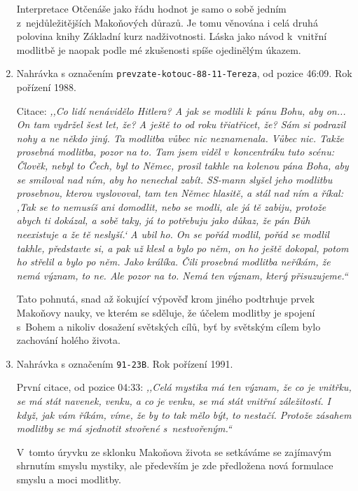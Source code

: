 \begin{enumerate}
{    Interpretace Otčenáše jako řádu hodnot je samo o sobě jedním
    z~nejdůležitějších Makoňových důrazů. Je tomu věnována i celá druhá polovina
    knihy Základní kurz nadživotnosti.\cite{KaMaZKN} Láska jako návod k~vnitřní
    modlitbě je naopak podle mé zkušenosti spíše ojedinělým úkazem.
  }
  \item{
    Nahrávka s označením \texttt{prevzate-kotouc-88-11-Tereza}, od pozice 46:09.
    Rok pořízení 1988.

    Citace: \textit{%
      ,,Co lidí nenávidělo Hitlera? A jak se modlili k~pánu Bohu, aby on... On tam
      vydržel šest let, že? A ještě to od roku třiatřicet, že? Sám si podrazil
      nohy a ne někdo jiný. Ta modlitba vůbec nic neznamenala. Vůbec nic. Takže
      prosebná modlitba, pozor na to. Tam jsem viděl v~koncentráku tuto scénu:
      Člověk, nebyl to Čech, byl to Němec, prosil takhle na kolenou pána Boha,
      aby se smiloval nad ním, aby ho nenechal zabít. SS-mann slyšel jeho
      modlitbu prosebnou, kterou vyslovoval, tam ten Němec hlasitě, a stál nad
      ním a říkal: ,Tak se to nemusíš ani domodlit, nebo se modli, ale já tě
      zabiju, protože abych ti dokázal, a sobě taky, já to potřebuju jako důkaz,
      že pán Bůh neexistuje a že tě neslyší.` A ubil ho. On se pořád modlil,
      pořád se modlil takhle, představte si, a pak už klesl a bylo po něm, on ho
      ještě dokopal, potom ho střelil a bylo po něm. Jako králíka. Čili prosebná
      modlitba neříkám, že nemá význam, to ne. Ale pozor na to. Nemá ten význam,
      který přisuzujeme.``
    }

    Tato pohnutá, snad až šokující výpověď krom jiného podtrhuje prvek
    Makoňovy nauky, ve kterém se sděluje, že účelem modlitby je spojení s~Bohem
    a nikoliv dosažení světských cílů, byť by světským cílem bylo zachování
    holého života.
  }
  \item{
    Nahrávka s označením \texttt{91-23B}.
    Rok pořízení 1991.

    První citace, od pozice 04:33: \textit{%
      ,,Celá mystika má ten význam, že co je vnitřku, se má stát navenek, venku, a
      co je venku, se má stát vnitřní záležitostí. I když, jak vám říkám, víme,
      že by to tak mělo být, to nestačí. Protože zásahem modlitby se má
      sjednotit stvořené s~nestvořeným.``
    }

    V~tomto úryvku ze sklonku Makoňova života se setkáváme se zajímavým shrnutím
    smyslu mystiky, ale především je zde předložena nová formulace smyslu a moci
    modlitby.

}
\end{enumerate}
